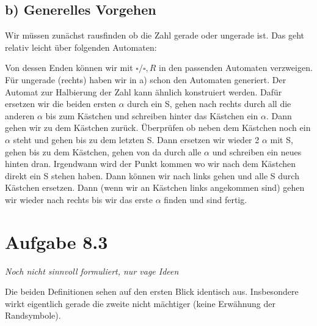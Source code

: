 \documentclass{article}
\begin{document}
\subsection*{b) Generelles Vorgehen}
Wir müssen zunächst rausfinden ob die Zahl gerade oder ungerade ist. Das geht relativ leicht über folgenden Automaten:
\begin{center}
\end{center}
Von dessen Enden können wir mit $\square/\square,R$ in den passenden Automaten verzweigen. Für ungerade (rechts) haben wir in a) schon den Automaten generiert. Der Automat zur Halbierung der Zahl kann ähnlich konstruiert werden. Dafür ersetzen wir die beiden ersten $\alpha$ durch ein S, gehen nach rechts durch all die anderen $\alpha$ bis zum Kästchen und schreiben hinter das Kästchen ein $\alpha$. Dann gehen wir zu dem Kästchen zurück. Überprüfen ob neben dem Kästchen noch ein $\alpha$ steht und gehen bis zu dem letzten S. Dann ersetzen wir wieder 2 $\alpha$ mit S, gehen bis zu dem Kästchen, gehen von da durch alle $\alpha$ und schreiben ein neues hinten dran. Irgendwann wird der Punkt kommen wo wir nach dem Kästchen direkt ein S stehen haben. Dann können wir nach links gehen und alle S durch Kästchen ersetzen. Dann (wenn wir an Kästchen links angekommen sind) gehen wir wieder nach rechts bis wir das erste $\alpha$ finden und sind fertig.

\section*{Aufgabe 8.3}
\emph{Noch nicht sinnvoll formuliert, nur vage Ideen}

Die beiden Definitionen sehen auf den ersten Blick identisch aus. Insbesondere wirkt eigentlich gerade die zweite nicht mächtiger (keine Erwähnung der Randsymbole). 
\end{document}
